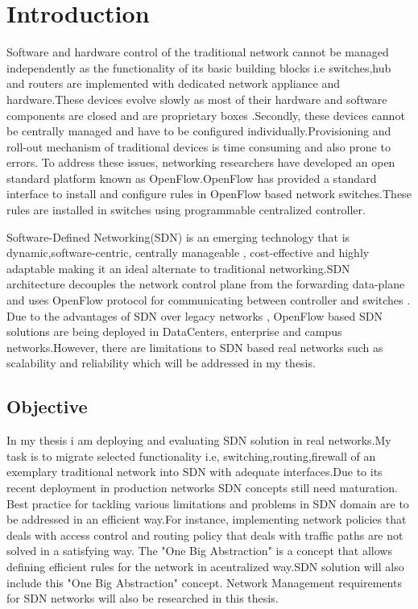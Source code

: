 
\chapter{Introduction}
\label{ch:Introduction}
Software and hardware control of the traditional network cannot be managed independently as the functionality of its basic building blocks i.e switches,hub and routers are implemented with dedicated network appliance and hardware.These devices evolve slowly as most of their hardware and software components are closed and are proprietary boxes .Secondly, these devices cannot be centrally managed and have to be configured individually.Provisioning and roll-out mechanism of traditional devices is time consuming and also prone to errors\cite{openflow}.
To address these issues, networking researchers have developed an open standard platform known as OpenFlow\cite{openflow}.OpenFlow has provided a standard interface to install and configure rules in OpenFlow based network switches.These rules are installed in switches using programmable centralized controller. 

Software-Defined Networking(SDN) is an emerging technology that is dynamic,software-centric, centrally manageable , cost-effective and highly adaptable making it an ideal alternate to traditional networking\cite{openstandard}.SDN architecture decouples the network control plane from the forwarding data-plane and uses OpenFlow protocol for communicating between controller and switches . Due to the advantages of SDN over legacy networks , OpenFlow based SDN solutions are being deployed in DataCenters, enterprise and campus networks.However,  there are  limitations to SDN based real networks such as scalability and reliability  which will be addressed in my thesis.    \cite{li00,jackson91,lakhina04a,netflow,rfc2386,sloman,techrep1,ref2,TB98} 
\section{Objective}
\label{ch:Einleitung:sec:Zielsetzung}
In my thesis i am deploying and evaluating SDN solution in real networks.My task is to migrate selected functionality i.e, switching,routing,firewall of an exemplary traditional network into SDN with adequate interfaces.Due to its recent deployment in production networks SDN concepts still need maturation. Best practice for tackling various limitations and problems in SDN domain are to be addressed in an efficient way.For instance, implementing network policies  that deals with access control and routing policy that deals with traffic paths are not solved in a satisfying way.
The "One Big Abstraction" is a concept that allows defining efficient rules for the network in acentralized way\cite{TB98}.SDN solution will also include  this "One Big Abstraction" concept. Network Management requirements for SDN networks will also be researched in this thesis.

